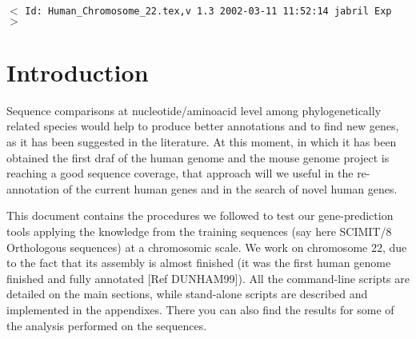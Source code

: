 \documentclass[11pt]{article}
\newcommand{\sctn}[1]{\section{#1}}
\begin{document}
\tableofcontents
\listoftables
\listoffigures

\vfill
\begin{center}
{\small$<$ \verb$Id: Human_Chromosome_22.tex,v 1.3 2002-03-11 11:52:14 jabril Exp $$>$ }
\end{center}


\newpage
{}
\setcounter{page}{1}

\sctn{Introduction}

Sequence comparisons at nucleotide/aminoacid level among phylogenetically related species would help to produce better annotations and to find new genes, as it has been suggested in the literature. At this moment, in which it has been obtained the first draf of the human genome and the mouse genome project is reaching a good sequence coverage, that approach will we useful in the re-annotation of the current human genes and in the search of novel human genes. 
\begin{comment}
Homology between human and mouse sequences serves as a useful guide for identifying genes in both organisms. Additionally, conserved sequences that have no coding potential are good candidates for regulatory elements.
-- From \url|http://bio.cse.psu.edu/mousegroup/doc.html|
An annotation of the orthologous test set of genomic sequences and their regulatory regions is available at \url|http://bio.cse.psu.edu/mousegroup/test8/|
\end{comment}

This document contains the procedures we followed to test our gene-prediction tools applying the knowledge from the training sequences (say here SCIMIT/8 Orthologous sequences) at a chromosomic scale. We work on chromosome 22, due to the fact that its assembly is almost finished (it was the first human genome finished and fully annotated [Ref DUNHAM99]). All the command-line scripts are detailed on the main sections, while stand-alone scripts are described and implemented in the appendixes. There you can also find the results for some of the analysis performed on the sequences. 
\end{document}
